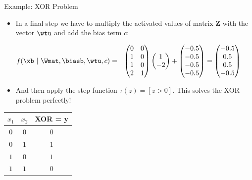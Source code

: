 \begin{vbframe}{Example: XOR Problem}
{\framebreak
  \begin{itemize}
    \item In a final step we have to multiply the activated values of matrix $\bm{Z}$ with the vector $\wtu$ and add the bias term $c$:
  \end{itemize}
  \begin{eqnarray*}
    f(\xb ~|~ \Wmat, \biasb, \wtu, c) &=&
    \begin{pmatrix}
      0 & 0 \\
      1 & 0 \\
      1 & 0 \\
      2 & 1
    \end{pmatrix}
    \begin{pmatrix}
      1 \\
      -2
    \end{pmatrix} + 
    \begin{pmatrix}
      - 0.5 \\
      - 0.5 \\
      - 0.5 \\
      - 0.5
    \end{pmatrix}
    =
    \begin{pmatrix}
      - 0.5 \\
      0.5 \\
      0.5 \\
      - 0.5
    \end{pmatrix}
  \end{eqnarray*}
  \begin{itemize}
    \item And then apply the step function $\tau(z) = [z > 0 ]$.  This solves the XOR problem perfectly!
  \end{itemize}
  \begin{table}
    \centering
      \begin{tabular}{ccc}
        \textbf{$x_1$}  & \textbf{$x_2$}  & \textbf{XOR} = y\\
        \hline
        \hline
        $0$             &   $0$           &  $0$ \\
        $0$             &   $1$           &  $1$ \\
        $1$             &   $0$           &  $1$ \\
        $1$             &   $1$           &  $0$
      \end{tabular}
  \end{table}
  }
\end{vbframe}




